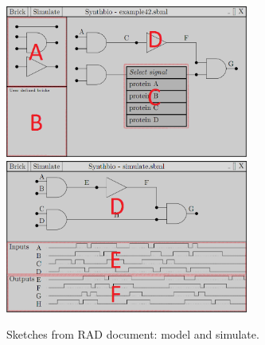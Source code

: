 \documentclass[a4paper]{article}
\begin{document}
\begin{figure}[h!]
\includegraphics[width=8cm]{pictures/gui_sketch1_marks.png} 
\includegraphics[width=8cm]{pictures/gui_sketch2_marks.png}
\caption{Sketches from RAD document: model and simulate.}
\end{figure}
\end{document}
